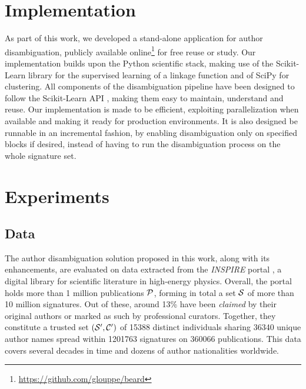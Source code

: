 \documentclass{article}
\begin{document}

\section{Implementation}
\label{implementation}

As part of this work, we developed a stand-alone application for author
disambiguation, publicly available online\footnote{\url{https://github.com/glouppe/beard}} for free reuse
or study.
Our implementation builds upon the Python scientific stack, making
use of the Scikit-Learn library \citep{scikitlearn} for the supervised learning
of a linkage function and of SciPy \citep{scipy} for clustering.
All components of the disambiguation pipeline have been designed to follow the
Scikit-Learn API \citep{scikitlearnAPI}, making them easy to maintain,
understand and reuse.
Our implementation is made to be efficient, exploiting parallelization when available and
making it ready for production environments.
It is also designed be runnable
in an incremental fashion, by enabling disambiguation only on specified blocks if desired,
instead of having to run the disambiguation process on the whole signature set.



\section{Experiments}
\label{experiments}

\subsection{Data}

The author disambiguation solution proposed in this work, along with its
enhancements, are evaluated on data extracted from the \emph{INSPIRE} portal
\citep{gentil2009information}, a digital library for scientific literature in
high-energy physics.
Overall, the portal holds more than 1 million publications ${\cal P}$,
forming in total a set ${\cal S}$ of more than 10 million signatures.
Out of these, around 13\% have been \textit{claimed} by their
original authors or marked as such by professional curators.
Together, they constitute a trusted set $({\cal S}^\prime, {\cal C}^\prime)$ of 15388 distinct individuals sharing
36340 unique author names spread within 1201763 signatures on 360066
publications. This data covers several decades in time and dozens of author
nationalities worldwide.
\end{document}
